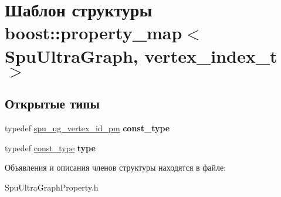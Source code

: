 \hypertarget{structboost_1_1property__map_3_01_spu_ultra_graph_00_01vertex__index__t_01_4}{}\section{Шаблон структуры boost\+:\+:property\+\_\+map$<$ Spu\+Ultra\+Graph, vertex\+\_\+index\+\_\+t $>$}
\label{structboost_1_1property__map_3_01_spu_ultra_graph_00_01vertex__index__t_01_4}
\subsection*{Открытые типы}
\begin{DoxyCompactItemize}
\item 
\mbox{\label{structboost_1_1property__map_3_01_spu_ultra_graph_00_01vertex__index__t_01_4_a6f4697da5aa31a486b43fbc7f15f9ca5}} 
typedef \hyperlink{classboost_1_1spu__ug__readable__property__map}{spu\+\_\+ug\+\_\+vertex\+\_\+id\+\_\+pm} {\bfseries const\+\_\+type}
\item 
\mbox{\label{structboost_1_1property__map_3_01_spu_ultra_graph_00_01vertex__index__t_01_4_ab7b15feec22f208ff59138675cd8402b}} 
typedef \hyperlink{classboost_1_1spu__ug__readable__property__map}{const\+\_\+type} {\bfseries type}
\end{DoxyCompactItemize}


Объявления и описания членов структуры находятся в файле\+:\begin{DoxyCompactItemize}
\item 
Spu\+Ultra\+Graph\+Property.\+h\end{DoxyCompactItemize}

